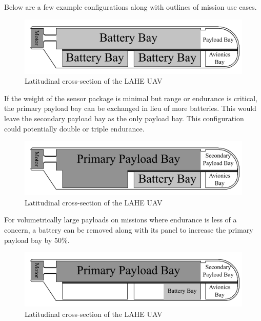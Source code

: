 \documentclass[12pt]{article}
\begin{document}
	Below are a few example configurations along with outlines of mission use cases.
	
	\begin{figure}[h!]
		\centering
		\includegraphics[width=6 in]{Media/UltraEnduranceConfig.png} %
		\caption{Latitudinal cross-section of the LAHE UAV}
		\label{fig:ultra_endurance_config}
	\end{figure}
	
	If the weight of the sensor package is minimal but range or endurance is critical, the primary payload bay can be exchanged in lieu of more batteries. This would leave the secondary payload bay as the only payload bay. This configuration could potentially double or triple endurance.
	
	\newpage
	
	\begin{figure}[h!]
		\centering
		\includegraphics[width=6 in]{Media/HighPayloadConfig.png} %
		\caption{Latitudinal cross-section of the LAHE UAV}
		\label{fig:high_payload_config}
	\end{figure}
	
	For volumetrically large payloads on missions where endurance is less of a concern, a battery can be removed along with its panel to increase the primary payload bay by 50\%.
	
	\begin{figure}[h!]
		\centering
		\includegraphics[width=6 in]{Media/HighDensityPayloadConfig.png} %
		\caption{Latitudinal cross-section of the LAHE UAV}
		\label{fig:high_density_payload_config}
	\end{figure}
	
\end{document}
